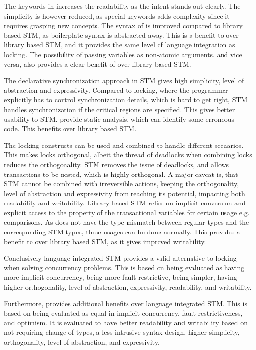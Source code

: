 The keywords in \stmname increases the readability as the intent stands out clearly. The simplicity is however reduced, as special keywords adds complexity since it requires grasping new concepts. The syntax of \stmname is improved compared to library based \ac{STM}, as boilerplate syntax is abstracted away. This is a benefit to \stmname over library based \ac{STM}, and it provides the same level of language integration as locking. The possibility of passing  variables as non-atomic arguments, and vice versa, also provides a clear benefit of \stmname over library based \ac{STM}. 

The declarative synchronization approach in \ac{STM} gives high simplicity, level of abstraction and expressivity. Compared to locking, where the programmer explicitly has to control synchronization details, which is hard to get right, \ac{STM} handles synchronization if the critical regions are specified. This gives better usability to \ac{STM}. \stmname provide static analysis, which can identify some erroneous code. This benefits \stmname over library based \ac{STM}.

The locking constructs can be used and combined to handle different scenarios. This makes locks orthogonal, albeit the thread of deadlocks when combining locks reduces the orthogonality. \ac{STM} removes the issue of deadlocks, and allows transactions to be nested, which is highly orthogonal. A major caveat is, that \ac{STM} cannot be combined with irreversible actions, keeping the orthogonality, level of abstraction and expressivity from reaching its potential, impacting both readability and writability. Library based \ac{STM} relies on implicit conversion and explicit access to the  property of the transactional variables for certain usage e.g. comparisons. As \stmname does not have the type mismatch between regular types and the corresponding \ac{STM} types, these usages can be done normally. This provides a benefit to \stmname over library based \ac{STM}, as it gives improved writability.


Conclusively language integrated \ac{STM} provides a valid alternative to locking when solving concurrency problems. This is based on being evaluated as having more implicit concurrency, being more fault restrictive, being simpler, having higher orthogonality, level of abstraction, expressivity, readability, and writability.

Furthermore, \stmname provides additional benefits over language integrated \ac{STM}. This is based on being evaluated as equal in implicit concurrency, fault restrictiveness, and optimism. It is evaluated to have better readability and writability based on not requiring change of types, a less intrusive syntax design, higher simplicity, orthogonality, level of abstraction, and expressivity.

\worksheetend